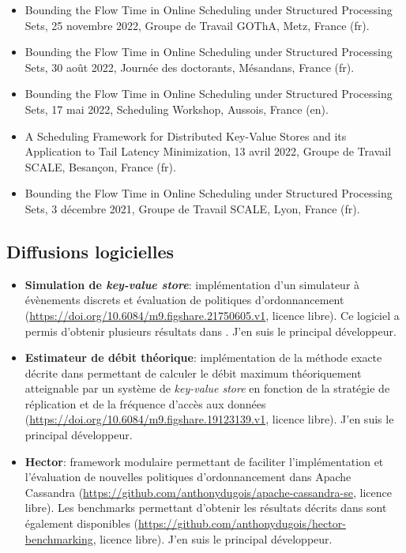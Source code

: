\documentclass[12pt]{article}
\begin{document}
\begin{itemize}
  \item \foreignlanguage{english}{Bounding the Flow Time in Online Scheduling under Structured
  Processing Sets}, 25 novembre 2022, Groupe de Travail GOThA, Metz, France (fr).
  \item \foreignlanguage{english}{Bounding the Flow Time in Online Scheduling under Structured
  Processing Sets}, 30 août 2022, Journée des doctorants, Mésandans, France (fr).
  \item \foreignlanguage{english}{Bounding the Flow Time in Online Scheduling under Structured
  Processing Sets}, 17 mai 2022, Scheduling Workshop, Aussois, France (en).
  \item \foreignlanguage{english}{A Scheduling Framework for Distributed Key-Value Stores and its
  Application to Tail Latency Minimization}, 13 avril 2022, Groupe de Travail SCALE, Besançon,
  France (fr).
  \item \foreignlanguage{english}{Bounding the Flow Time in Online Scheduling under Structured
  Processing Sets}, 3 décembre 2021, Groupe de Travail SCALE, Lyon, France (fr).
\end{itemize}

\subsection{Diffusions logicielles}

\begin{itemize}
    \item \textbf{Simulation de \emph{key-value store}}: implémentation d'un simulateur à évènements
    discrets et évaluation de politiques d'ordonnancement
    (\url{https://doi.org/10.6084/m9.figshare.21750605.v1}, licence libre). Ce logiciel a permis
    d'obtenir plusieurs résultats dans \cite{benmokhtar2021}. J'en suis le
    principal développeur.
    \item \textbf{Estimateur de débit théorique}: implémentation de la méthode exacte décrite dans
    \cite{canon2022} permettant de calculer le débit maximum théoriquement atteignable par un
    système de \emph{key-value store} en fonction de la stratégie de réplication et de la fréquence
    d'accès aux données (\url{https://doi.org/10.6084/m9.figshare.19123139.v1}, licence libre). J'en
    suis le principal développeur.
    \item \textbf{Hector}: framework modulaire permettant de faciliter l'implémentation et
    l'évaluation de nouvelles politiques d'ordonnancement dans Apache Cassandra
    (\url{https://github.com/anthonydugois/apache-cassandra-se}, licence libre). Les benchmarks
    permettant d'obtenir les résultats décrits dans \cite{canon2023b} sont également disponibles
    (\url{https://github.com/anthonydugois/hector-benchmarking}, licence libre). J'en suis le
    principal développeur.
\end{itemize}
\end{document}
